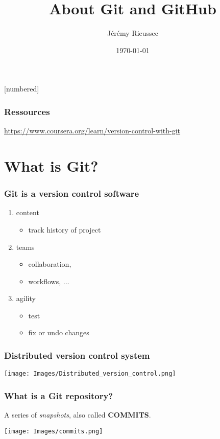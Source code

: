 \documentclass{beamer}
\title{About Git and GitHub}
\subtitle{}
\author{Jérémy Rieussec}
\institute{University of Montreal}
\date{\today}
\begin{document}
	
	
	[numbered]
	
	\begin{frame}[plain]
		\titlepage{}
	\end{frame}		

	\begin{frame}[plain]
		\frametitle{Ressources}
		\small		
		\url{https://www.coursera.org/learn/version-control-with-git}
	\end{frame}



    \begin{frame}[plain]
		\tableofcontents
	\end{frame}	

	
	\section{What is Git?}
    \begin{frame}[plain]
		\frametitle{Git is a \textbf{version control software} }
		\begin{enumerate}
			\item content
			\begin{itemize}
				\item track history of project
			\end{itemize}
			\item teams
			\begin{itemize}
				\item collaboration, 
				\item workflows,  $\dots$
			\end{itemize}
			\item agility
			\begin{itemize}
				\item test
				\item fix or undo changes
			\end{itemize}
		\end{enumerate}
	\end{frame}	

	\begin{frame}[plain]
		\frametitle{Distributed version control system}
		
		\texttt{[image: Images/Distributed\_version\_control.png]}
	\end{frame}

	\begin{frame}[plain]
		\frametitle{What is a Git repository?}
		A series of \textit{snapshots}, also called \textbf{COMMITS}.
		\begin{center}
			\texttt{[image: Images/commits.png]}

		\end{center}
	\end{frame}
\end{document}
